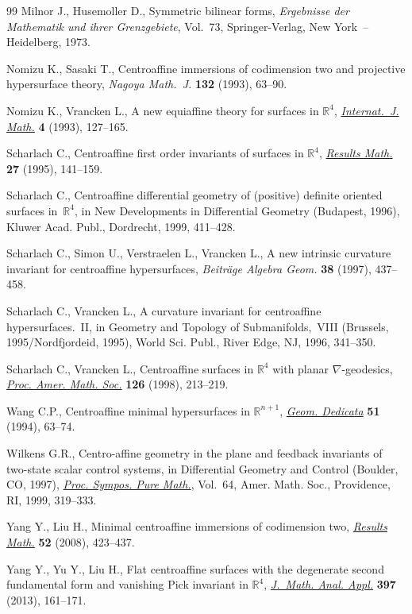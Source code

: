\documentclass[10pt,a4paper]{amsart}
\numberwithin{equation}{section}
\theoremstyle{definition}
\begin{document}
\begin{thebibliography}{99}
Milnor J., Husemoller D., Symmetric bilinear forms, \textit{Ergebnisse der
  Mathematik und ihrer Grenzgebiete}, Vol.~73, Springer-Verlag, New York~--
  Heidelberg, 1973.

Nomizu K., Sasaki T., Centroaffine immersions of codimension two and projective
  hypersurface theory, \textit{Nagoya Math.~J.} \textbf{132} (1993), 63--90.

Nomizu K., Vrancken L., A new equiaffine theory for surfaces in {${\mathbb
  R}^4$}, \href{http://dx.doi.org/10.1142/S0129167X9300008X}{\textit{Internat.~J. Math.}} \textbf{4} (1993), 127--165.

Scharlach C., Centroaffine first order invariants of surfaces in {${\mathbb
  R}^4$}, \href{http://dx.doi.org/10.1007/BF03322278}{\textit{Results Math.}} \textbf{27} (1995), 141--159.

Scharlach C., Centroaffine differential geometry of (positive) definite
  oriented surfaces in~{${\mathbb R}^4$}, in New De\-ve\-lop\-ments in Differential
  Geometry ({B}udapest, 1996), Kluwer Acad. Publ., Dordrecht, 1999, 411--428.

Scharlach C., Simon U., Verstraelen L., Vrancken L., A new intrinsic curvature
  invariant for centroaffine hypersurfaces, \textit{Beitr\"age Algebra Geom.}
  \textbf{38} (1997), 437--458.

Scharlach C., Vrancken L., A curvature invariant for centroaffine
  hypersurfaces.~{II}, in Geometry and Topo\-lo\-gy of Submanifolds,~{VIII}
  ({B}russels, 1995/{N}ordfjordeid, 1995), World Sci. Publ., River Edge, NJ,
  1996, 341--350.

Scharlach C., Vrancken L., Centroaffine surfaces in {${\mathbb R}^4$} with
  planar {$\nabla$}-geodesics, \href{http://dx.doi.org/10.1090/S0002-9939-98-04408-6}{\textit{Proc. Amer. Math. Soc.}} \textbf{126}
  (1998), 213--219.

Wang C.P., Centroaffine minimal hypersurfaces in {${\mathbb R}^{n+1}$},
  \href{http://dx.doi.org/10.1007/BF01264101}{\textit{Geom. Dedicata}} \textbf{51} (1994), 63--74.

Wilkens G.R., Centro-affine geometry in the plane and feedback invariants of
  two-state scalar control systems, in Differential Geometry and Control
  ({B}oulder, {CO}, 1997), \href{http://dx.doi.org/10.1090/pspum/064/1654544}{\textit{Proc. Sympos. Pure Math.}}, Vol.~64, Amer.
  Math. Soc., Providence, RI, 1999, 319--333.

Yang Y., Liu H., Minimal centroaffine immersions of codimension two,
  \href{http://dx.doi.org/10.1007/s00025-008-0321-5}{\textit{Results Math.}} \textbf{52} (2008), 423--437.

Yang Y., Yu Y., Liu H., Flat centroaffine surfaces with the degenerate second
  fundamental form and vani\-shing {P}ick invariant in {$\mathbb{R}^4$},
  \href{http://dx.doi.org/10.1016/j.jmaa.2012.07.047}{\textit{J.~Math. Anal. Appl.}} \textbf{397} (2013), 161--171.

\end{thebibliography}
\end{document}
